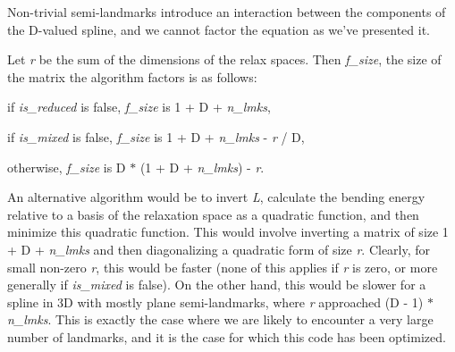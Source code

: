 Non-\/trivial semi-\/landmarks introduce an interaction between the components of the D-\/valued spline, and we cannot factor the equation as we've presented it.

Let {\itshape r\/} be the sum of the dimensions of the relax spaces. Then {\itshape f\_\-size\/}, the size of the matrix the algorithm factors is as follows:
\begin{DoxyItemize}
\item if {\itshape is\_\-reduced\/} is {\ttfamily false}, {\itshape f\_\-size\/} is 1 + D + {\itshape n\_\-lmks\/},
\item if {\itshape is\_\-mixed\/} is {\ttfamily false}, {\itshape f\_\-size\/} is 1 + D + {\itshape n\_\-lmks\/} -\/ {\itshape r\/} / D,
\item otherwise, {\itshape f\_\-size\/} is D $\ast$ (1 + D + {\itshape n\_\-lmks\/}) -\/ {\itshape r\/}.
\end{DoxyItemize}

An alternative algorithm would be to invert {\itshape L\/}, calculate the bending energy relative to a basis of the relaxation space as a quadratic function, and then minimize this quadratic function. This would involve inverting a matrix of size 1 + D + {\itshape n\_\-lmks\/} and then diagonalizing a quadratic form of size {\itshape r\/}. Clearly, for small non-\/zero {\itshape r\/}, this would be faster (none of this applies if {\itshape r\/} is zero, or more generally if {\itshape is\_\-mixed\/} is {\ttfamily false}). On the other hand, this would be slower for a spline in 3D with mostly plane semi-\/landmarks, where {\itshape r\/} approached (D -\/ 1) $\ast$ {\itshape n\_\-lmks\/}. This is exactly the case where we are likely to encounter a very large number of landmarks, and it is the case for which this code has been optimized. 